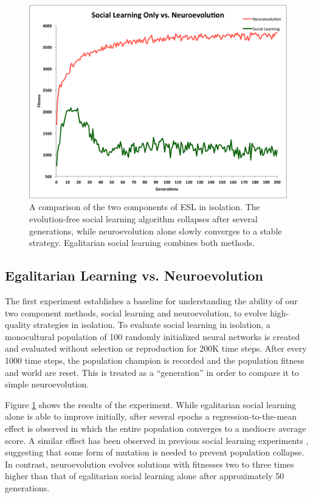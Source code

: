 \documentclass{sig-alternate}
\begin{document}

\begin{figure}
  \centering
    \includegraphics[scale=.41]{social_learning_vs_neuroevolution.pdf}
  \caption{A comparison of the two components of ESL in isolation.  The evolution-free social learning algorithm collapses after several generations, while neuroevolution alone slowly converges to a stable strategy.  Egalitarian social learning combines both methods.}
  \label{fig:social-neuro}
\end{figure}

\subsection*{Egalitarian Learning vs. Neuroevolution}

The first experiment establishes a baseline for understanding the ability of our two component methods, social learning and neuroevolution, to evolve high-quality strategies in isolation. To evaluate social learning in isolation, a monocultural population of 100 randomly initialized neural networks is created and evaluated without selection or reproduction for 200K time steps. After every 1000 time steps, the population champion is recorded and the population fitness and world are reset. This is treated as a ``generation'' in order to compare it to simple neuroevolution.

Figure \ref{fig:social-neuro} shows the results of the experiment. While egalitarian social learning alone is able to improve initially, after several epochs a regression-to-the-mean effect is observed in which the entire population converges to a mediocre average score. A similar effect has been observed in previous social learning experiments \cite{denaro1996cultural}, suggesting that some form of mutation is needed to prevent population collapse. In contrast, neuroevolution evolves solutions with fitnesses two to three times higher than that of egalitarian social learning alone after approximately 50 generations.
\end{document}
